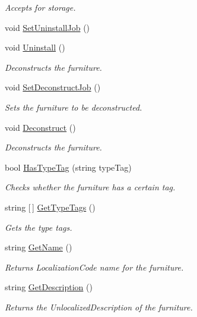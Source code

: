 \begin{DoxyCompactItemize}
\begin{DoxyCompactList}\small\item\em Accepts for storage. \end{DoxyCompactList}\item 
void \hyperlink{class_furniture_afe6b540a3cc9ea3e3a7d951ad9d92097}{Set\+Uninstall\+Job} ()
\item 
void \hyperlink{class_furniture_ae369f8b64c986a029ffe7b9ecf5d3f30}{Uninstall} ()
\begin{DoxyCompactList}\small\item\em Deconstructs the furniture. \end{DoxyCompactList}\item 
void \hyperlink{class_furniture_a3049fb349d8e8990ab703ca641488d59}{Set\+Deconstruct\+Job} ()
\begin{DoxyCompactList}\small\item\em Sets the furniture to be deconstructed. \end{DoxyCompactList}\item 
void \hyperlink{class_furniture_a7ca16a3c95b1bf9b3d3f60c543e691b5}{Deconstruct} ()
\begin{DoxyCompactList}\small\item\em Deconstructs the furniture. \end{DoxyCompactList}\item 
bool \hyperlink{class_furniture_ac7197b3778cafab778581d936d2b5983}{Has\+Type\+Tag} (string type\+Tag)
\begin{DoxyCompactList}\small\item\em Checks whether the furniture has a certain tag. \end{DoxyCompactList}\item 
string \mbox{[}$\,$\mbox{]} \hyperlink{class_furniture_aca7ba6acd54e3969018a2f8848dc2632}{Get\+Type\+Tags} ()
\begin{DoxyCompactList}\small\item\em Gets the type tags. \end{DoxyCompactList}\item 
string \hyperlink{class_furniture_a4cca1807f72cdf61fe438976db5ecf9c}{Get\+Name} ()
\begin{DoxyCompactList}\small\item\em Returns Localization\+Code name for the furniture. \end{DoxyCompactList}\item 
string \hyperlink{class_furniture_af77901f8fc7bfde9ab7dfe55a5bdb57a}{Get\+Description} ()
\begin{DoxyCompactList}\small\item\em Returns the Unlocalized\+Description of the furniture. \end{DoxyCompactList}\item 

\end{DoxyCompactItemize}
